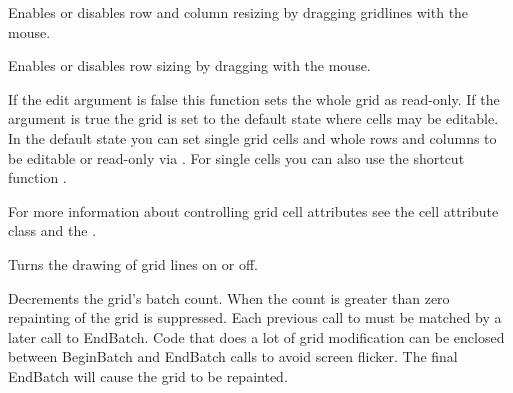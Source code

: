 Enables or disables row and column resizing by dragging gridlines with the mouse.



\label{wxgridenabledragrowsize}


Enables or disables row sizing by dragging with the mouse.



\label{wxgridenableediting}


If the edit argument is false this function sets the whole grid as read-only. If the
argument is true the grid is set to the default state where cells may be editable. In the
default state you can set single grid cells and whole rows and columns to be editable or
read-only via
. For single
cells you can also use the shortcut function
.

For more information about controlling grid cell attributes see the
 cell attribute class and the
.



\label{wxgridenablegridlines}


Turns the drawing of grid lines on or off.



\label{wxgridendbatch}


Decrements the grid's batch count. When the count is greater than zero repainting of
the grid is suppressed. Each previous call to
 must be matched by a later call to
EndBatch. Code that does a lot of grid modification can be enclosed between
BeginBatch and EndBatch calls to avoid screen flicker. The final EndBatch will
cause the grid to be repainted.





